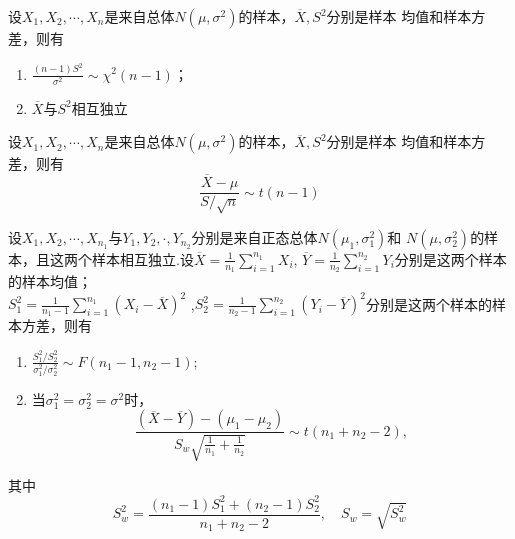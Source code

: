 \begin{theorem}
    设$X_1,X_2,\cdots,X_n$是来自总体$N(\mu,\sigma^2)$的样本，$\overline{X},S^2$分别是样本
    均值和样本方差，则有
    \begin{enumerate}[1$^{\circ}$]
        \item $\displaystyle{\frac{(n-1)S^2}{\sigma^2}\sim \chi^2(n-1)}$；
        \item $\overline{X}$与$S^2$相互独立
    \end{enumerate} 
\end{theorem}

\begin{theorem}
    设$X_1,X_2,\cdots,X_n$是来自总体$N(\mu,\sigma^2)$的样本，$\overline{X},S^2$分别是样本
    均值和样本方差，则有
    $$\frac{\overline{X}-\mu}{S/\sqrt{n}}\sim t(n-1)$$
\end{theorem}

\begin{theorem}
    设$X_1,X_2,\cdots,X_{n_1}$与$Y_1,Y_2,\cdot,Y_{n_2}$分别是来自正态总体$N(\mu_1,\sigma_1^2)$和
    $N(\mu,\sigma_2^2)$的样本，且这两个样本相互独立.设$\displaystyle{\overline{X}=\frac{1}{n_1}\sum_{i=1}^{n_1}X_i}$,
    $\displaystyle{\overline{Y}=\frac{1}{n_2}\sum_{i=1}^{n_2}Y_i}$分别是这两个样本的样本均值；\\
    $\displaystyle{S_1^2=\frac{1}{n_1-1}\sum_{i=1}^{n_1}{(X_i-\overline{X})}^2}$
    ,$\displaystyle{S^2_2=\frac{1}{n_2-1}\sum_{i=1}^{n_2}{(Y_i-\overline{Y})}^2}$分别是这两个样本的样本方差，则有
    \begin{enumerate}[1$^{\circ}$]
        \item $\displaystyle{\frac{S_1^2/S_2^2}{\sigma_1^2/\sigma_2^2}\sim F(n_1-1,n_2-1)}$;
        \item 当$\sigma_1^2=\sigma_2^2=\sigma^2$时，
        $$\frac{(\overline{X}-\overline{Y})-(\mu_1-\mu_2)}{S_w\sqrt{\frac{1}{n_1}+\frac{1}{n_2}}}\sim t(n_1+n_2-2),$$
    \end{enumerate}
    其中
    $$S_w^2=\frac{(n_1-1)S_1^2+(n_2-1)S_2^2}{n_1+n_2-2},\quad S_w=\sqrt{S_w^2}$$
\end{theorem}